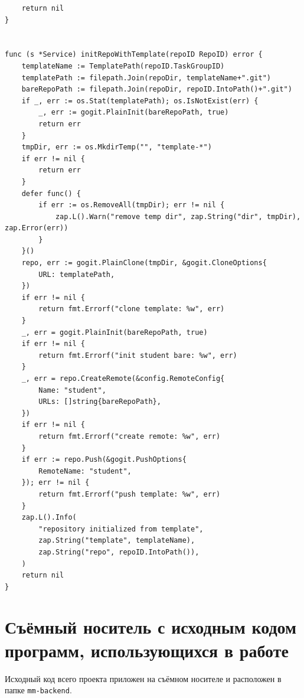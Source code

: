 \documentclass[coursework]{SCWorks}
\begin{document}
\begin{verbatim}
	return nil
}


func (s *Service) initRepoWithTemplate(repoID RepoID) error {
	templateName := TemplatePath(repoID.TaskGroupID)
	templatePath := filepath.Join(repoDir, templateName+".git")
	bareRepoPath := filepath.Join(repoDir, repoID.IntoPath()+".git")
	if _, err := os.Stat(templatePath); os.IsNotExist(err) {
		_, err := gogit.PlainInit(bareRepoPath, true)
		return err
	}
	tmpDir, err := os.MkdirTemp("", "template-*")
	if err != nil {
		return err
	}
	defer func() {
		if err := os.RemoveAll(tmpDir); err != nil {
			zap.L().Warn("remove temp dir", zap.String("dir", tmpDir), zap.Error(err))
		}
	}()
	repo, err := gogit.PlainClone(tmpDir, &gogit.CloneOptions{
		URL: templatePath,
	})
	if err != nil {
		return fmt.Errorf("clone template: %w", err)
	}
	_, err = gogit.PlainInit(bareRepoPath, true)
	if err != nil {
		return fmt.Errorf("init student bare: %w", err)
	}
	_, err = repo.CreateRemote(&config.RemoteConfig{
		Name: "student",
		URLs: []string{bareRepoPath},
	})
	if err != nil {
		return fmt.Errorf("create remote: %w", err)
	}
	if err := repo.Push(&gogit.PushOptions{
		RemoteName: "student",
	}); err != nil {
		return fmt.Errorf("push template: %w", err)
	}
	zap.L().Info(
		"repository initialized from template",
		zap.String("template", templateName),
		zap.String("repo", repoID.IntoPath()),
	)
	return nil
}

\end{verbatim}

\section{Съёмный носитель с исходным кодом программ, использующихся в работе}

Исходный код всего проекта приложен на съёмном носителе и расположен в папке \texttt{mm-backend}.
\end{document}
